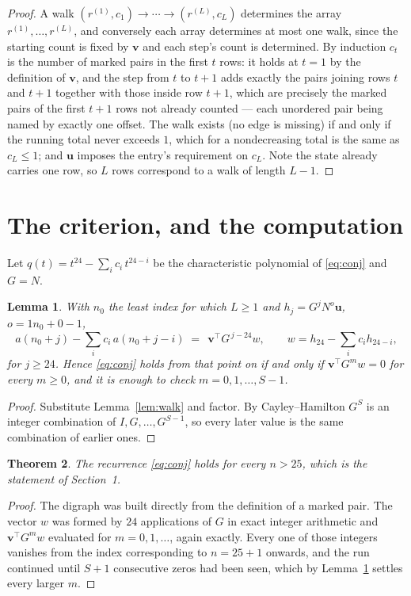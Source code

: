 \documentclass[11pt,a4paper]{article}
\theoremstyle{plain}
\newtheorem{theorem}{Theorem}
\newtheorem{lemma}[theorem]{Lemma}
\theoremstyle{definition}
\begin{document}
\begin{proof}
A walk $(r^{(1)},c_1)\to\cdots\to(r^{(L)},c_L)$ determines the array
$r^{(1)},\dots,r^{(L)}$, and conversely each array determines at most one walk, since the
starting count is fixed by $\mathbf{v}$ and each step's count is determined. By induction
$c_t$ is the number of marked pairs in the first $t$ rows: it holds at $t=1$ by the
definition of $\mathbf{v}$, and the step from $t$ to $t+1$ adds exactly the pairs joining
rows $t$ and $t+1$ together with those inside row $t+1$, which are precisely the marked
pairs of the first $t+1$ rows not already counted --- each unordered pair being named by
exactly one offset. The walk exists (no edge is missing) if and only if the running total
never exceeds $1$, which for a nondecreasing total is the same as $c_L\le1$; and
$\mathbf{u}$ imposes the entry's requirement on $c_L$. Note the state already carries one
row, so $L$ rows correspond to a walk of length $L-1$.
\end{proof}

\section{The criterion, and the computation}

Let $q(t)=t^{24}-\sum_i c_i\,t^{24-i}$ be the characteristic polynomial of
\eqref{eq:conj} and $G=N$.

\begin{lemma}\label{lem:crit}
With $n_0$ the least index for which $L\ge1$ and $h_j=G^{j}N^{o}\mathbf{u}$,
$o=1n_0+0-1$,
\[
a(n_0+j)-\sum_i c_i\,a(n_0+j-i)\;=\;\,\mathbf{v}^{\!\top}G^{\,j-24}w,
\qquad w=h_{24}-\sum_i c_i h_{24-i},
\]
for $j\ge24$. Hence \eqref{eq:conj} holds from that point on if and only if
$\mathbf{v}^{\!\top}G^{m}w=0$ for every $m\ge0$, and it is enough to check
$m=0,1,\dots,S-1$.
\end{lemma}

\begin{proof}
Substitute Lemma~\ref{lem:walk} and factor. By Cayley--Hamilton $G^{S}$ is an integer
combination of $I,G,\dots,G^{S-1}$, so every later value is the same combination of earlier
ones.
\end{proof}

\begin{theorem}
The recurrence \eqref{eq:conj} holds for every $n>25$, which is the statement of
Section~1.
\end{theorem}

\begin{proof}
The digraph was built directly from the definition of a marked pair. The vector $w$ was
formed by $24$ applications of $G$ in exact integer arithmetic and
$\mathbf{v}^{\!\top}G^{m}w$ evaluated for $m=0,1,\dots$, again exactly. Every one of
those integers vanishes from the index corresponding to $n=25+1$ onwards, and the run
continued until $S+1$ consecutive zeros had been seen, which by Lemma~\ref{lem:crit}
settles every larger $m$.
\end{proof}
\end{document}
